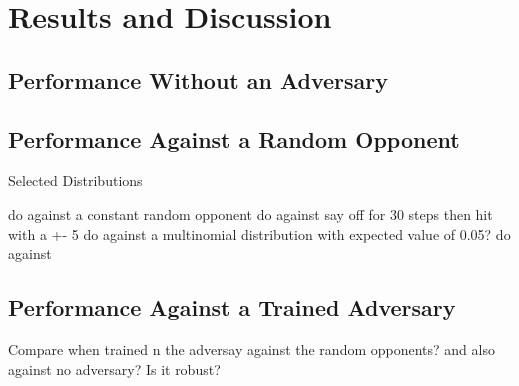\documentclass[../main.tex]{subfiles}
\begin{document}
\onlyinsubfile{\tableofcontents{}}
\chapter{Results and Discussion}

\section{Performance Without an Adversary}


\section{Performance Against a Random Opponent}
Selected Distributions

do against a constant random opponent
do against say off for 30 steps then hit with a +- 5
do against a multinomial distribution with expected value of 0.05?
do against

\section{Performance Against a Trained Adversary}

Compare when trained n the adversay against the random opponents? and also against no adversary? Is it robust?
\end{document}
